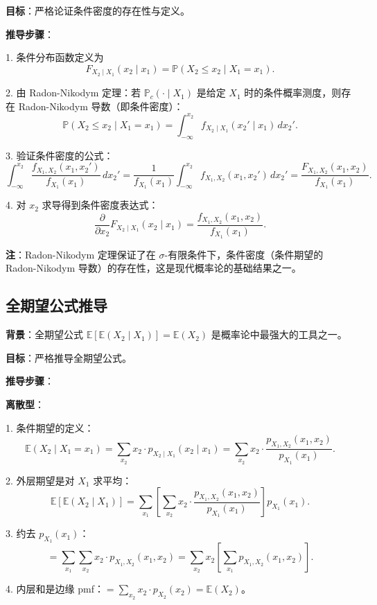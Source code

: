 \textbf{目标}：严格论证条件密度的存在性与定义。

\textbf{推导步骤}：

1. 条件分布函数定义为
\[
F_{X_2 \mid X_1}(x_2 \mid x_1) = \mathbb{P}(X_2 \leq x_2 \mid X_1 = x_1).
\]

2. 由 Radon-Nikodym 定理：若 $\mathbb{P}_c(\cdot \mid X_1)$ 是给定 $X_1$ 时的条件概率测度，则存在 Radon-Nikodym 导数（即条件密度）：
\[
\mathbb{P}(X_2 \leq x_2 \mid X_1 = x_1) = \int_{-\infty}^{x_2} f_{X_2 \mid X_1}(x_2' \mid x_1) \, dx_2'.
\]

3. 验证条件密度的公式：
\[
\int_{-\infty}^{x_2} \frac{f_{X_1, X_2}(x_1, x_2')}{f_{X_1}(x_1)} \, dx_2' = \frac{1}{f_{X_1}(x_1)} \int_{-\infty}^{x_2} f_{X_1, X_2}(x_1, x_2') \, dx_2' = \frac{F_{X_1, X_2}(x_1, x_2)}{f_{X_1}(x_1)}.
\]

4. 对 $x_2$ 求导得到条件密度表达式：
\[
\frac{\partial}{\partial x_2} F_{X_2 \mid X_1}(x_2 \mid x_1) = \frac{f_{X_1, X_2}(x_1, x_2)}{f_{X_1}(x_1)}.
\]

\textbf{注}：Radon-Nikodym 定理保证了在 $\sigma$-有限条件下，条件密度（条件期望的 Radon-Nikodym 导数）的存在性，这是现代概率论的基础结果之一。

\subsection{全期望公式推导}\label{sec:derivation-ch2-law-total-expectation}

\textbf{背景}：全期望公式 $\mathbb{E}[\mathbb{E}(X_2 \mid X_1)] = \mathbb{E}(X_2)$ 是概率论中最强大的工具之一。

\textbf{目标}：严格推导全期望公式。

\textbf{推导步骤}：

\textbf{离散型}：

1. 条件期望的定义：
\[
\mathbb{E}(X_2 \mid X_1 = x_1) = \sum_{x_2} x_2 \cdot p_{X_2 \mid X_1}(x_2 \mid x_1) = \sum_{x_2} x_2 \cdot \frac{p_{X_1, X_2}(x_1, x_2)}{p_{X_1}(x_1)}.
\]

2. 外层期望是对 $X_1$ 求平均：
\[
\mathbb{E}[\mathbb{E}(X_2 \mid X_1)] = \sum_{x_1} \left[ \sum_{x_2} x_2 \cdot \frac{p_{X_1, X_2}(x_1, x_2)}{p_{X_1}(x_1)} \right] p_{X_1}(x_1).
\]

3. 约去 $p_{X_1}(x_1)$：
\[
= \sum_{x_1} \sum_{x_2} x_2 \cdot p_{X_1, X_2}(x_1, x_2) = \sum_{x_2} x_2 \left[ \sum_{x_1} p_{X_1, X_2}(x_1, x_2) \right].
\]

4. 内层和是边缘 pmf：$= \sum_{x_2} x_2 \cdot p_{X_2}(x_2) = \mathbb{E}(X_2)$。


